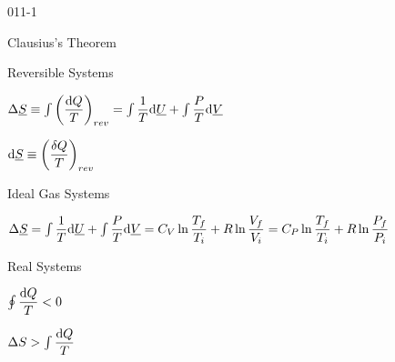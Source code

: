 \begin{mitframe}{011-1}


	\begin{listone}
	
    	\item Clausius's Theorem
    
    	\begin{listtwo}
	
    		\item Reversible Systems
    		  
            \begin{listthree}
	
    			\item$\iipf\uline{\entropy}\equiv\int\nolimits\bigg(\dfrac{\mathrm{d}\heatflow}{\Temp}\bigg)_{rev}=\int\nolimits\dfrac{1}{\Temp}\mathrm{d}\uline{\uvel}+\int\nolimits\dfrac{\p}{\Temp}\mathrm{d}\uline{\vol}$
                
    			\item $\mathrm{d}\uline{\entropy}\equiv\bigg(\dfrac{\blthick\heatflow}{\Temp}\bigg)_{rev}$
    
			\end{listthree}  
    		
            \item Ideal Gas Systems
    		  
            \begin{listthree}
	
    			\item$\iipf\stressvec=\int\nolimits\dfrac{1}{\Temp}\mathrm{d}\uline{\uvel}+\int\nolimits\dfrac{\p}{\Temp}\mathrm{d}\uline{\vol}=\cv\ln\dfrac{\Temp_{f}}{\Temp_{i}}+\gasconst\ln\dfrac{\vol_{f}}{\vol_{i}}=\cp\ln\dfrac{\Temp_{f}}{\Temp_{i}}+\gasconst\ln\dfrac{\p_{f}}{\p_{i}}$
                
    
			\end{listthree} 
            
            \item Real Systems
    		  
            \begin{listthree}
	
    			\item$\oint\nolimits\dfrac{\mathrm{d}\heatflow}{\Temp}<0$
    		    		
    			\item$\iipf\entropy>\int\nolimits\dfrac{\mathrm{d}\heatflow}{\Temp}$
    

\end{listthree}
\end{listtwo}
\end{listone}
\end{mitframe}
